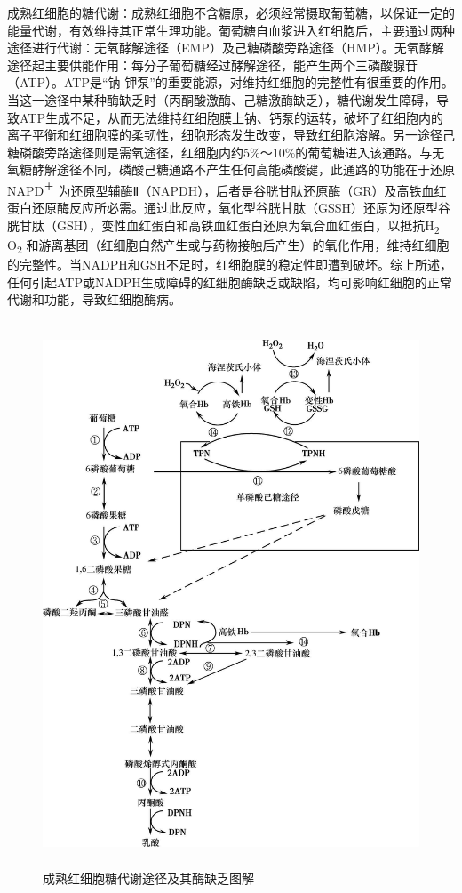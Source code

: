 成熟红细胞的糖代谢：成熟红细胞不含糖原，必须经常摄取葡萄糖，以保证一定的能量代谢，有效维持其正常生理功能。葡萄糖自血浆进入红细胞后，主要通过两种途径进行代谢：无氧酵解途径（EMP）及己糖磷酸旁路途径（HMP）。无氧酵解途径起主要供能作用：每分子葡萄糖经过酵解途径，能产生两个三磷酸腺苷（ATP）。ATP是“钠-钾泵”的重要能源，对维持红细胞的完整性有很重要的作用。当这一途径中某种酶缺乏时（丙酮酸激酶、己糖激酶缺乏），糖代谢发生障碍，导致ATP生成不足，从而无法维持红细胞膜上钠、钙泵的运转，破坏了红细胞内的离子平衡和红细胞膜的柔韧性，细胞形态发生改变，导致红细胞溶解。另一途径己糖磷酸旁路途径则是需氧途径，红细胞内约5\%～10\%的葡萄糖进入该通路。与无氧糖酵解途径不同，磷酸己糖通路不产生任何高能磷酸键，此通路的功能在于还原NAPD\textsuperscript{＋}
为还原型辅酶Ⅱ（NAPDH），后者是谷胱甘肽还原酶（GR）及高铁血红蛋白还原酶反应所必需。通过此反应，氧化型谷胱甘肽（GSSH）还原为还原型谷胱甘肽（GSH），变性血红蛋白和高铁血红蛋白还原为氧合血红蛋白，以抵抗H\textsubscript{2}
O\textsubscript{2}
和游离基团（红细胞自然产生或与药物接触后产生）的氧化作用，维持红细胞的完整性。当NADPH和GSH不足时，红细胞膜的稳定性即遭到破坏。综上所述，任何引起ATP或NADPH生成障碍的红细胞酶缺乏或缺陷，均可影响红细胞的正常代谢和功能，导致红细胞酶病。

\begin{figure}[!htbp]
 \centering
 \includegraphics[width=5.01042in,height=6.38542in]{./images/Image00172.jpg}
 \captionsetup{justification=centering}
 \caption{成熟红细胞糖代谢途径及其酶缺乏图解}
 \label{fig33-3}
  \end{figure} 


